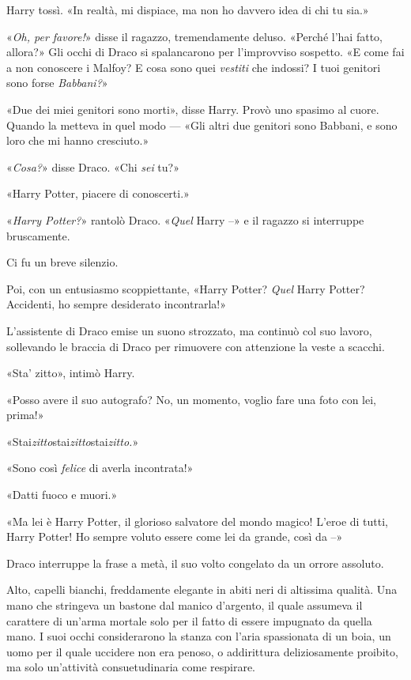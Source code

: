 Harry tossì. «In realtà, mi dispiace, ma non ho davvero idea di chi tu sia.»

«\textit{Oh, per favore!}» disse il ragazzo, tremendamente deluso. «Perché l’hai fatto, allora?» Gli occhi di Draco si spalancarono per l’improvviso sospetto. «E come fai a non conoscere i Malfoy? E cosa sono quei \textit{vestiti} che indossi? I tuoi genitori sono forse \textit{Babbani?}»

«Due dei miei genitori sono morti», disse Harry. Provò uno spasimo al cuore. Quando la metteva in quel modo — «Gli altri due genitori sono Babbani, e sono loro che mi hanno cresciuto.»

«\textit{Cosa?}» disse Draco. «Chi \textit{sei} tu?»

«Harry Potter, piacere di conoscerti.»

«\textit{Harry Potter?}» rantolò Draco. «\textit{Quel} Harry –» e il ragazzo si interruppe bruscamente.

Ci fu un breve silenzio.

Poi, con un entusiasmo scoppiettante, «Harry Potter? \textit{Quel} Harry Potter? Accidenti, ho sempre desiderato incontrarla!»

L’assistente di Draco emise un suono strozzato, ma continuò col suo lavoro, sollevando le braccia di Draco per rimuovere con attenzione la veste a scacchi.

«Sta’ zitto», intimò Harry.

«Posso avere il suo autografo? No, un momento, voglio fare una foto con lei, prima!»

«Stai\textit{zitto}stai\textit{zitto}stai\textit{zitto.}»

«Sono così \textit{felice} di averla incontrata!»

«Datti fuoco e muori.»

«Ma lei è Harry Potter, il glorioso salvatore del mondo magico! L’eroe di tutti, Harry Potter! Ho sempre voluto essere come lei da grande, così da –»

Draco interruppe la frase a metà, il suo volto congelato da un orrore assoluto.

Alto, capelli bianchi, freddamente elegante in abiti neri di altissima qualità. Una mano che stringeva un bastone dal manico d’argento, il quale assumeva il carattere di un’arma mortale solo per il fatto di essere impugnato da quella mano. I suoi occhi considerarono la stanza con l’aria spassionata di un boia, un uomo per il quale uccidere non era penoso, o addirittura deliziosamente proibito, ma solo un’attività consuetudinaria come respirare.

